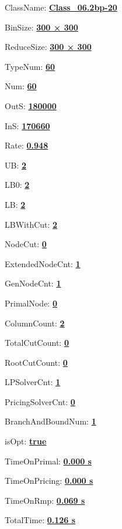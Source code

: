 \documentclass[11pt]{article}
\begin{document}
\pagestyle{empty}


ClassName: \underline{\textbf{Class_06.2bp-20}}
\par
BinSize: \underline{\textbf{300 × 300}}
\par
ReduceSize: \underline{\textbf{300 × 300}}
\par
TypeNum: \underline{\textbf{60}}
\par
Num: \underline{\textbf{60}}
\par
OutS: \underline{\textbf{180000}}
\par
InS: \underline{\textbf{170660}}
\par
Rate: \underline{\textbf{0.948}}
\par
UB: \underline{\textbf{2}}
\par
LB0: \underline{\textbf{2}}
\par
LB: \underline{\textbf{2}}
\par
LBWithCut: \underline{\textbf{2}}
\par
NodeCut: \underline{\textbf{0}}
\par
ExtendedNodeCnt: \underline{\textbf{1}}
\par
GenNodeCnt: \underline{\textbf{1}}
\par
PrimalNode: \underline{\textbf{0}}
\par
ColumnCount: \underline{\textbf{2}}
\par
TotalCutCount: \underline{\textbf{0}}
\par
RootCutCount: \underline{\textbf{0}}
\par
LPSolverCnt: \underline{\textbf{1}}
\par
PricingSolverCnt: \underline{\textbf{0}}
\par
BranchAndBoundNum: \underline{\textbf{1}}
\par
isOpt: \underline{\textbf{true}}
\par
TimeOnPrimal: \underline{\textbf{0.000 s}}
\par
TimeOnPricing: \underline{\textbf{0.000 s}}
\par
TimeOnRmp: \underline{\textbf{0.069 s}}
\par
TotalTime: \underline{\textbf{0.126 s}}
\par
\newpage
\end{document}
